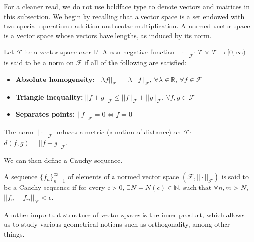 For a cleaner read, we do not use boldface type to denote vectors and matrices in this subsection. We begin by recalling that a vector space is a set endowed with two special operations: addition and scalar multiplication. A normed vector space is a vector space whose vectors have lengths, as induced by its norm.

\begin{definition}[Norms]
	Let $\mathcal F$ be a vector space over $\mathbb R$. A non-negative function $||\cdot||_{\mathcal F}:\mathcal F \times \mathcal F \rightarrow \mathbb [0,\infty)$ is said to be a norm  on $\mathcal F$ if all of the following are satisfied:
	\begin{itemize}
	\item \textbf{Absolute homogeneity:} $||\lambda f||_{\mathcal F} = |\lambda| ||f||_{\mathcal F}$, $\forall \lambda \in \mathbb R$, $\forall f \in \mathcal F$
	\item \textbf{Triangle inequality:} $||f+g||_{\mathcal F} \leq ||f||_{\mathcal F} + ||g||_{\mathcal F}$, $\forall f,g \in \mathcal F$
	\item \textbf{Separates points:} $||f||_{\mathcal F} = 0 \Leftrightarrow f=0$
	\end{itemize}
	The norm $||\cdot||_{\mathcal F}$ induces a metric (a notion of distance) on $\mathcal F$: $d(f,g) = ||f-g||_{\mathcal F}$.
\end{definition}

We can then define a Cauchy sequence.

\begin{definition}
	A sequence $\{f_n\}_{n=1}^\infty$ of elements of a normed vector space $(\mathcal F, ||\cdot ||_{\mathcal F})$ is said to be a Cauchy sequence if for every $\epsilon > 0$, $\exists N=N(\epsilon) \in \mathbb N$, such that $\forall n,m > N$, $||f_n - f_m||_{\mathcal F} < \epsilon$.
\end{definition}

Another important structure of vector spaces is the inner product, which allows us to study various geometrical notions such as orthogonality, among other things.

